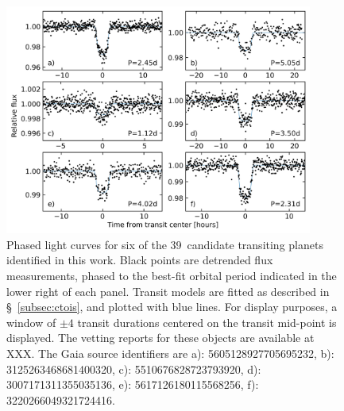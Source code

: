 \documentclass[12pt,twocolumn,tighten]{aastex62}
\newcommand{\numberpcs}{39\ }  %
\begin{document}
\begin{figure}[!t]
	\begin{center}
		\leavevmode
		\includegraphics[width=0.9\textwidth]{quilt_PCs.png}
	\end{center}
	\vspace{-0.2cm}
	\caption{
		Phased light curves for six of the \numberpcs candidate
			transiting planets identified in this work.
		Black points are detrended flux measurements, phased to the
		best-fit orbital period indicated in the lower right of each
		panel.
    Transit models are fitted as described in \S~\ref{subsec:ctois},
    and plotted with blue lines.
		For display purposes, a window of $\pm 4$ transit durations
		centered on the transit mid-point is displayed.
		The vetting reports for these objects are available at XXX.	%
		The Gaia source identifiers are
		a): 5605128927705695232, 
		b): 3125263468681400320, 
		c): 5510676828723793920, 
		d): 3007171311355035136, 
		e): 5617126180115568256, 
		f): 3220266049321724416.   
		\label{fig:ctoi_quilt}
	}
\end{figure}
\end{document}
